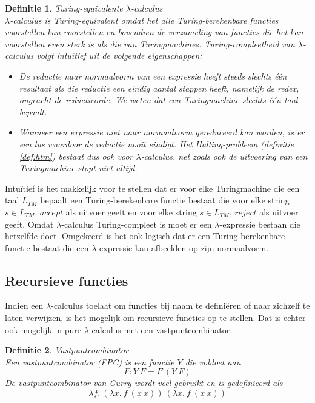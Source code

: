 \documentclass[a4paper]{article}
\newtheorem{tdefinitie}{Definitie}[section]
\newenvironment{definitie}[1]%
  {\begin{mdframed}[backgroundcolor=silver,
    topline=false,
    rightline=false,
    leftline=false,
    bottomline=false]\begin{tdefinitie}#1\\\normalfont}%
  {\end{tdefinitie}\end{mdframed}}
\begin{document}
\begin{definitie}{Turing-equivalente $\lambda$-calculus}
  \label{def:tmlambda}
  $\lambda$-calculus is Turing-equivalent omdat het alle Turing-berekenbare functies voorstellen kan voorstellen en bovendien de verzameling van functies die het kan voorstellen even sterk is als die van Turingmachines. Turing-compleetheid van $\lambda$-calculus volgt intu\"itief uit de volgende eigenschappen:
  \begin{itemize}
  \item De reductie naar normaalvorm van een expressie heeft steeds slechts \'e\'en resultaat als die reductie een eindig aantal stappen heeft, namelijk de redex, ongeacht de reductieorde. We weten dat een Turingmachine slechts \'e\'en taal bepaalt.
  \item Wanneer een expressie niet naar normaalvorm gereduceerd kan worden, is er een lus waardoor de reductie nooit eindigt. Het Halting-probleem (definitie \ref{def:htm}) bestaat dus ook voor $\lambda$-calculus, net zoals ook de uitvoering van een Turingmachine stopt niet altijd.
  \end{itemize}
\end{definitie}

Intu\"itief is het makkelijk voor te stellen dat er voor elke Turingmachine die een taal $L_{TM}$ bepaalt een Turing-berekenbare functie bestaat die voor elke string $s \in L_{TM}$, $accept$ als uitvoer geeft en voor elke string $s \in \overline{L_{TM}}$, $reject$ als uitvoer geeft. Omdat $\lambda$-calculus Turing-compleet is moet er een $\lambda$-expressie bestaan die hetzelfde doet. Omgekeerd is het ook logisch dat er een Turing-berekenbare functie bestaat die een $\lambda$-expressie kan afbeelden op zijn normaalvorm.

\subsection{Recursieve functies}

Indien een $\lambda$-calculus toelaat om functies bij naam te defini\"eren of naar zichzelf te laten verwijzen, is het mogelijk om recursieve functies op te stellen. Dat is echter ook mogelijk in pure $\lambda$-calculus met een vastpuntcombinator.

\begin{definitie}{Vastpuntcombinator}
  Een vastpuntcombinator (FPC) is een functie $Y$ die voldoet aan
  \begin{equation*}
  F: Y\ F = F\ (Y\ F)
  \end{equation*}
  De vastpuntcombinator van Curry wordt veel gebruikt en is gedefinieerd als
  \begin{equation*}
  \lambda f.\ (\lambda x.\ f\ (x\ x))\ (\lambda x.\ f\ (x\ x))
  \end{equation*}
\end{definitie}




\end{document}
